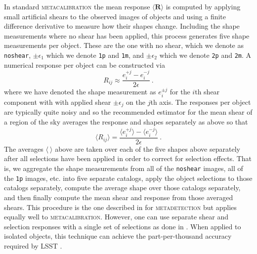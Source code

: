 \documentclass[twocolumn]{openjournal}
\makeatletter
\newcommand{\mdet}{\textsc{metadetection}\@\xspace}
\newcommand{\mcal}{\textsc{metacalibration}\@\xspace}
\newcommand{\noshear}{\texttt{noshear}\@\xspace}
\makeatother
\begin{document}
In standard \mcal the mean response $\langle \mathbf{R} \rangle$ is computed by applying
small artificial shears to the observed images of objects and using a finite difference
derivative to measure how their shapes change. Including the shape measurements where no
shear has been applied, this process generates five shape measurements per object. These
are the one with no shear, which we denote as \texttt{noshear},
$\pm\epsilon_1$ which we denote \texttt{1p} and \texttt{1m}, and
$\pm\epsilon_2$ which we denote \texttt{2p} and \texttt{2m}.
A numerical response per object can be constructed via
\begin{equation} \label{eq:standard_R}
R_{ij} \approx \frac{e_i^{+j} - e_i^{-j}}{2\epsilon}\ .
\end{equation}
where we have denoted the shape measurement as $e_i^{\pm j}$ for the $i$th shear
component with  with applied shear $\pm\epsilon_j$ on the $j$th axis. The responses per
object are typically quite noisy and so the recommended estimator for the mean shear of
a region of the sky averages the response and shapes separately as above so that
\begin{equation*}
\langle R_{ij} \rangle = \frac{\langle e_i^{+j} \rangle - \langle e_i^{-j} \rangle}{2\epsilon}\ .
\end{equation*}
The averages $\langle\ \rangle$ above are taken over each of the five shapes above
separately after all selections have been applied in order to correct for selection
effects. That is, we aggregate the shape measurements from all of the \noshear images,
all of the \texttt{1p} images, etc. into five separate catalogs, apply the object
selections to those catalogs separately, compute the average shape over those catalogs
separately, and then finally compute the mean shear and response from those averaged
shears. This procedure is the one described in \citet{SheldonMdet2020} for \mdet but
applies equally well to \mcal. However, one can use separate shear and selection
responses with a single set of selections as done in \citet{SheldonMcal2017}. When
applied to isolated objects, this technique can achieve the part-per-thousand accuracy
required by LSST \citep{HuffMcal2017,SheldonMcal2017}.
\end{document}
